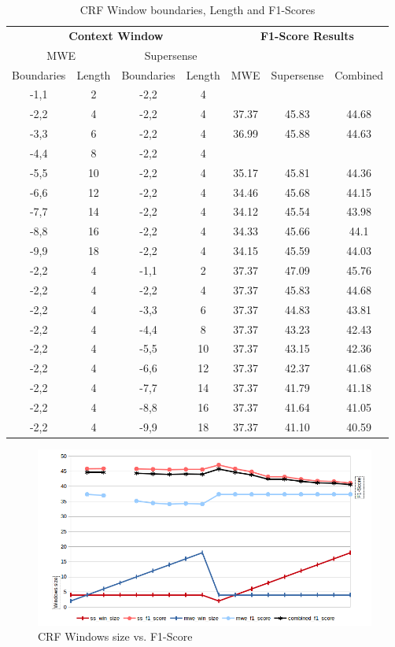 \newpage
\begin{table}[H]
\centering
\begin{tabular}{|cccc|ccc|}
\hline
\multicolumn{4}{|c|}{\bf Context Window} & \multicolumn{3}{c|}{\bf F1-Score Results}\\
\multicolumn{2}{|c}{MWE} & \multicolumn{2}{c|}{Supersense} &  &  &  \\
\hline
Boundaries & Length & Boundaries & Length & MWE & Supersense & Combined\\
\hline
-1,1 & 2 & -2,2 & 4 &  &  & \\
-2,2 & 4 & -2,2 & 4 & 37.37 & 45.83 & 44.68\\
-3,3 & 6 & -2,2 & 4 & 36.99 & 45.88 & 44.63\\
-4,4 & 8 & -2,2 & 4 &  &  & \\
-5,5 & 10 & -2,2 & 4 & 35.17 & 45.81 & 44.36\\
-6,6 & 12 & -2,2 & 4 & 34.46 & 45.68 & 44.15\\
-7,7 & 14 & -2,2 & 4 & 34.12 & 45.54 & 43.98\\
-8,8 & 16 & -2,2 & 4 & 34.33 & 45.66 & 44.1\\
-9,9 & 18 & -2,2 & 4 & 34.15 & 45.59 & 44.03\\
-2,2 & 4 & -1,1 & 2 & 37.37 & 47.09 & 45.76\\
-2,2 & 4 & -2,2 & 4 & 37.37 & 45.83 & 44.68\\
-2,2 & 4 & -3,3 & 6 & 37.37 & 44.83 & 43.81\\
-2,2 & 4 & -4,4 & 8 & 37.37 & 43.23 & 42.43\\
-2,2 & 4 & -5,5 & 10 & 37.37 & 43.15 & 42.36\\
-2,2 & 4 & -6,6 & 12 & 37.37 & 42.37 & 41.68\\
-2,2 & 4 & -7,7 & 14 & 37.37 & 41.79 & 41.18\\
-2,2 & 4 & -8,8 & 16 & 37.37 & 41.64 & 41.05\\
-2,2 & 4 & -9,9 & 18 & 37.37 & 41.10 & 40.59\\
\hline
\end{tabular}
\caption{CRF Window boundaries, Length and F1-Scores}
\label{tab:crfwinsizef1score}
\end{table}

\begin{figure}[H]
\centering
\includegraphics[width=\textwidth]{images/crf_win_size_f1_score.png}
\caption{CRF Windows size vs. F1-Score}
\label{fig:crfwinsizef1score}
\end{figure}

